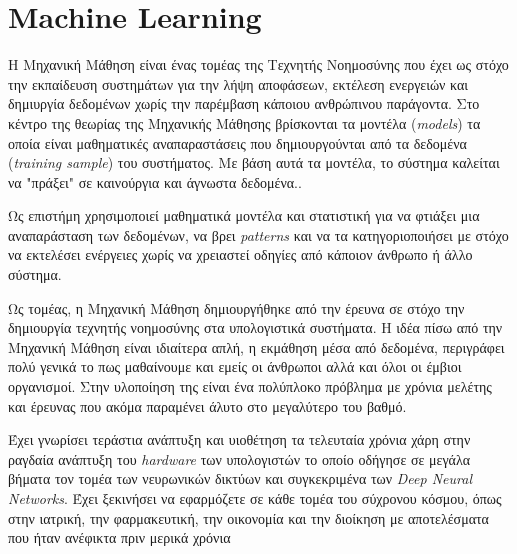 \thispagestyle{empty}

\chapter{Machine Learning}

Η Μηχανική Μάθηση είναι ένας τομέας της Τεχνητής Νοημοσύνης που έχει ως στόχο την εκπαίδευση συστημάτων για την λήψη αποφάσεων, εκτέλεση ενεργειών και δημιυργία δεδομένων χωρίς την παρέμβαση κάποιου ανθρώπινου παράγοντα. Στο κέντρο της θεωρίας της Μηχανικής Μάθησης βρίσκονται τα μοντέλα (\textit{models}) τα οποία είναι μαθηματικές αναπαραστάσεις που δημιουργούνται από τα δεδομένα (\textit{training sample}) του συστήματος. Με βάση αυτά τα μοντέλα, το σύστημα καλείται να "πράξει" σε καινούργια και άγνωστα δεδομένα..
\par
Ως επιστήμη χρησιμοποιεί μαθηματικά μοντέλα και στατιστική για να φτιάξει μια αναπαράσταση των δεδομένων, να βρει \textit{patterns} και να τα κατηγοριοποιήσει με στόχο να εκτελέσει ενέργειες χωρίς να χρειαστεί οδηγίες από κάποιον άνθρωπο ή άλλο σύστημα.
\par
Ως τομέας, η Μηχανική Μάθηση δημιουργήθηκε από την έρευνα σε στόχο την δημιουργία τεχνητής νοημοσύνης στα υπολογιστικά συστήματα. Η ιδέα πίσω από την Μηχανική Μάθηση είναι ιδιαίτερα απλή, η εκμάθηση μέσα από δεδομένα, περιγράφει πολύ γενικά το πως μαθαίνουμε και εμείς οι άνθρωποι αλλά και όλοι οι έμβιοι οργανισμοί. Στην υλοποίηση της είναι ένα πολύπλοκο πρόβλημα με χρόνια μελέτης και έρευνας που ακόμα παραμένει άλυτο στο μεγαλύτερο του βαθμό.
\par
Έχει γνωρίσει τεράστια ανάπτυξη και υιοθέτηση τα τελευταία χρόνια χάρη στην ραγδαία ανάπτυξη του \textit{hardware} των υπολογιστών το οποίο οδήγησε σε μεγάλα βήματα τον τομέα των νευρωνικών δικτύων και συγκεκριμένα των \textit{Deep Neural Networks}. Έχει ξεκινήσει να εφαρμόζετε σε κάθε τομέα του σύχρονου κόσμου, όπως στην ιατρική, την φαρμακευτική, την οικονομία και την διοίκηση με αποτελέσματα που ήταν ανέφικτα πριν μερικά χρόνια


